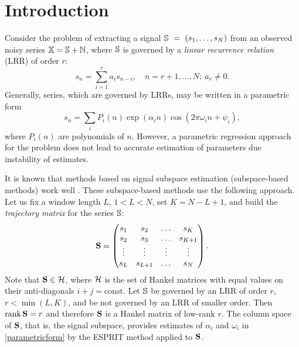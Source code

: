 \documentclass[sii]{ipart}
\def\rank{\mathop{\mathrm{rank}}}
\begin{document}
\begin{frontmatter}
\begin{keyword}[class=AMS]
\end{keyword}

\begin{keyword}
\end{keyword}


\end{frontmatter}

\section{Introduction}
Consider the problem of extracting a signal $\mathbb{S}~=~(s_1, \ldots, s_N)$ from an observed noisy series $\mathbb{X} = \mathbb{S} + \mathbb{N}$, where $\mathbb{S}$ is governed by a \emph{linear recurrence relation} (LRR) of order $r$:
\begin{equation*}
s_n = \sum_{i = 1}^{r} a_i s_{n-i}, \quad n = r + 1, \ldots, N;\  a_r\neq 0.
\end{equation*}
Generally, series, which are governed by LRRs, may be written in a parametric form
\begin{equation} \label{parametricform}
s_n = \sum_i P_i(n) \exp(\alpha_i n) \cos(2 \pi \omega_i n + \psi_i),
\end{equation}
where $P_i(n)$ are polynomials of $n$. However, a parametric regression approach for the problem does not lead to accurate estimation of parameters due instability of estimates.

It is known that methods based on signal subspace estimation (subspace-based methods) work well \cite{Broomhead.King1986, Vautard.etal1992, Elsner.Tsonis1996, Golyandina.etal2001}. These subspace-based methods use the following approach. Let us fix a window length $L$, $1 < L < N$, set $K = N - L + 1$, and build the \emph{trajectory matrix} for the series $\mathbb{S}$:
\begin{equation*}
\bfS = \begin{pmatrix}
s_1 & s_2 & \ldots & s_K \\
s_2 & s_3 & \ldots & s_{K + 1} \\
\vdots & \vdots & \vdots & \vdots \\
s_L & s_{L + 1} & \ldots & s_N
\end{pmatrix}.
\end{equation*}
Note that $\mathbf{S}\in \mathcal{H}$, where $\mathcal{H}$ is the set of Hankel matrices with equal values on their anti-diagonals $i+j=\mathrm{const}$.
 Let $\mathbb{S}$ be governed by an LRR of order $r$, $r < \min(L, K)$, and be not governed by an LRR of smaller order. Then $\rank \bfS = r$ and therefore $\mathbf{S}$ is a Hankel matrix of low-rank $r$. The column space of $\mathbf{S}$, that is, the  signal subspace, provides estimates of $\alpha_i$ and $\omega_i$ in \eqref{parametricform} by the ESPRIT method \cite{Roy.Kailath1989, Golyandina.Zhigljavsky2012} applied to $\mathbf{S}$.
\end{document}
